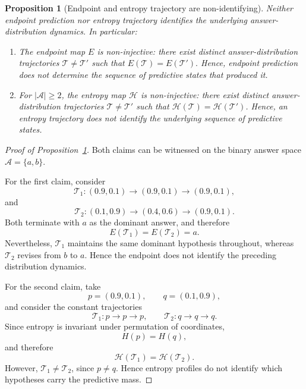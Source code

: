 \documentclass[10pt,a4paper]{amsart}
\newtheorem{proposition}{Proposition}
\begin{document}
\begin{proposition}[Endpoint and entropy trajectory are non-identifying]
\label{prop:nonidentifiability}
Neither endpoint prediction nor entropy trajectory identifies the underlying answer-distribution dynamics. In particular:

\begin{enumerate}
    \item The endpoint map \(E\) is non-injective: there exist distinct answer-distribution trajectories \(\mathcal{T}\neq\mathcal{T}'\) such that
    $
    E(\mathcal{T})=E(\mathcal{T}').
    $
    Hence, endpoint prediction does not determine the sequence of predictive states that produced it.
    \item For \(|\mathcal{A}|\geq 2\), the entropy map \(\mathcal{H}\) is non-injective: there exist distinct answer-distribution trajectories \(\mathcal{T} \neq \mathcal{T}'\) such that \(\mathcal{H}(\mathcal{T}) = \mathcal{H}(\mathcal{T}')\). Hence, an entropy trajectory does not identify the underlying sequence of predictive states.
\end{enumerate}
\end{proposition}

\begin{proof}[Proof of Proposition~\ref{prop:nonidentifiability}]
Both claims can be witnessed on the binary answer space \(\mathcal{A}=\{a,b\}\).

For the first claim, consider
\[
\mathcal{T}_1:
(0.9,0.1)
\rightarrow
(0.9,0.1)
\rightarrow
(0.9,0.1),
\]
and
\[
\mathcal{T}_2:
(0.1,0.9)
\rightarrow
(0.4,0.6)
\rightarrow
(0.9,0.1).
\]
Both terminate with \(a\) as the dominant answer, and therefore
\[
E(\mathcal{T}_1)=E(\mathcal{T}_2)=a.
\]
Nevertheless, \(\mathcal{T}_1\) maintains the same dominant hypothesis throughout, whereas \(\mathcal{T}_2\) revises from \(b\) to \(a\). Hence the endpoint does not identify the preceding distribution dynamics.

For the second claim, take
\[
p=(0.9,0.1),
\qquad
q=(0.1,0.9),
\]
and consider the constant trajectories
\[
\mathcal{T}_1 : p \to p \to p,
\qquad
\mathcal{T}_2 : q \to q \to q.
\]
Since entropy is invariant under permutation of coordinates,
\[
H(p)=H(q),
\]
and therefore
\[
\mathcal{H}(\mathcal{T}_1)
=
\mathcal{H}(\mathcal{T}_2).
\]
However, \(\mathcal{T}_1 \neq \mathcal{T}_2\), since \(p\neq q\). Hence entropy profiles do not identify which hypotheses carry the predictive mass.
\end{proof}
\end{document}
